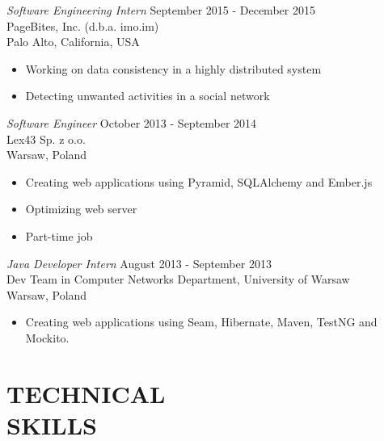 \documentclass[margin, 10pt]{res} %
\begin{document}
\begin{resume}
{\sl Software Engineering Intern} \hfill September 2015 - December 2015 \\
PageBites, Inc. (d.b.a. imo.im) \\
Palo Alto, California, USA

\begin{itemize} \itemsep -2pt %
\item Working on data consistency in a highly distributed system
\item Detecting unwanted activities in a social network
\end{itemize}


{\sl Software Engineer} \hfill October 2013 - September 2014 \\
Lex43 Sp. z o.o. \\ 
Warsaw, Poland

\begin{itemize} \itemsep -2pt %
\item Creating web applications using Pyramid, SQLAlchemy and Ember.js
\item Optimizing web server
\item Part-time job
\end{itemize}
 
{\sl Java Developer Intern } \hfill August 2013 - September 2013 \\
Dev Team in Computer Networks Department, University of Warsaw \\
Warsaw, Poland
\begin{itemize} 
\item Creating web applications using Seam, Hibernate, Maven, TestNG and Mockito.
\end{itemize}


\section{TECHNICAL \\ SKILLS} 


\end{resume}
\end{document}
